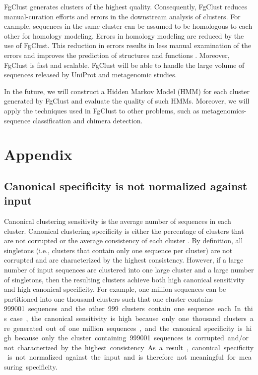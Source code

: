 \documentclass[11pt,letterpaper]{article}
\begin{document}
FgClust generates clusters of the highest quality. 
Consequently, FgClust reduces manual-curation efforts and errors in the downstream analysis of clusters.
For example, sequences in the same cluster can be assumed to be homologous to each other for homology modeling.
Errors in homology modeling are reduced by the use of FgClust.
This reduction in errors results in less manual examination of the errors and improves the prediction of structures and functions \citep{nayeem2006comparative}.
Moreover, FgClust is fast and scalable.
FgClust will be able to handle the large volume of sequences released by UniProt and metagenomic studies.

In the future, we will construct a Hidden Markov Model (HMM) for each cluster generated by FgClust and evaluate the quality of such HMMs.
Moreover, we will apply the techniques used in FgClust to other problems, such as metagenomics-sequence classification and chimera detection.%


%


\clearpage{}

\appendix

\section{Appendix}
\subsection{Canonical specificity is not normalized against input}
\label{sec:appendix:canonical-specificity}
Canonical clustering sensitivity is the average number of sequences in each cluster.
Canonical clustering specificity is either the percentage of clusters that are not corrupted \citep{hauser2013kclust} or the average consistency of each cluster \citep{hauser2016mmseqs,steinegger2017mmseqs2,steinegger2017linclust}.
By definition, all singletons (i.e., clusters that contain only one sequence per cluster) are not corrupted and are characterized by the highest consistency.
However, if a large number of input sequences are clustered into one large cluster and a large number of singletons, then the resulting clusters achieve both high canonical sensitivity and high canonical specificity.
For example, one million sequences can be partitioned into one thousand clusters such that one cluster contains \SI{999001} sequences and the other \SI{999} clusters contain one sequence each.
In this case, 
the canonical sensitivity is high because only one thousand clusters are generated out of one million sequences, 
and the canonical specificity is high because only the cluster containing \SI{999001} sequences is corrupted and/or not characterized by the highest consistency.
As a result, canonical specificity is not normalized against the input and is therefore not meaningful for measuring specificity.
\end{document}
